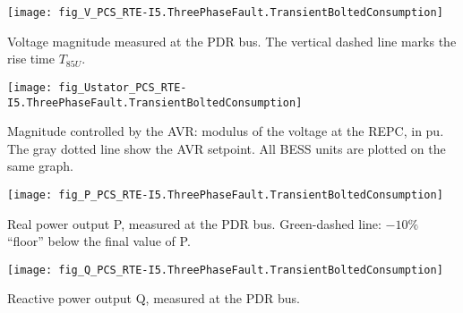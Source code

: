     \noindent
    \begin{minipage}[t]{0.48\textwidth}
        \centering
        \texttt{[image: fig\_V\_PCS\_RTE-I5.ThreePhaseFault.TransientBoltedConsumption]}
        \begin{minipage}[t]{0.8\textwidth}
            \small Voltage magnitude measured at the PDR bus.
            The vertical dashed line marks the rise time $T_{85U}$.
        \end{minipage}
    \end{minipage}
    \hfill
    \begin{minipage}[t]{0.48\textwidth}
        \centering
        \texttt{[image: fig\_Ustator\_PCS\_RTE-I5.ThreePhaseFault.TransientBoltedConsumption]}
        \begin{minipage}[t]{0.8\textwidth}
            \small Magnitude controlled by the AVR: modulus of the voltage at the REPC, in pu.
            The gray dotted line show the AVR setpoint. All BESS units are plotted on the same
            graph.
        \end{minipage}
    \end{minipage}

    \vspace{0.5cm}

    \noindent
    \begin{minipage}[t]{0.48\textwidth}
        \centering
        \texttt{[image: fig\_P\_PCS\_RTE-I5.ThreePhaseFault.TransientBoltedConsumption]}
        \begin{minipage}[t]{0.8\textwidth}
            \small Real power output P, measured at the PDR bus. Green-dashed
            line: $-10\%$ ``floor'' below the final value of P.
        \end{minipage}
    \end{minipage}
    \hfill
    \begin{minipage}[t]{0.48\textwidth}
        \centering
        \texttt{[image: fig\_Q\_PCS\_RTE-I5.ThreePhaseFault.TransientBoltedConsumption]}
        \begin{minipage}[t]{0.8\textwidth}
            \small Reactive power output Q, measured at the PDR bus.
        \end{minipage}
    \end{minipage}

    \vspace{0.5cm}

